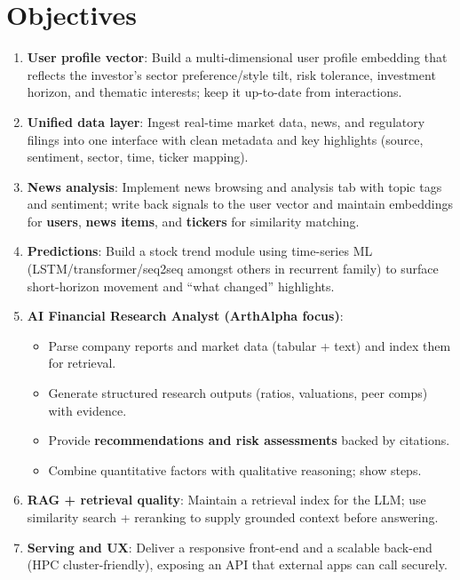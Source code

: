 \section{Objectives} 
\begin{enumerate}[label=(\alph*)]
  \item \textbf{User profile vector}: Build a multi-dimensional user profile embedding that reflects the investor's sector preference/style tilt, risk tolerance, investment horizon, and thematic interests; keep it up-to-date from interactions.
  \item \textbf{Unified data layer}: Ingest real-time market data, news, and regulatory filings into one interface with clean metadata and key highlights (source, sentiment, sector, time, ticker mapping).
  \item \textbf{News analysis}: Implement news browsing and analysis tab with topic tags and sentiment; write back signals to the user vector and maintain embeddings for \textbf{users}, \textbf{news items}, and \textbf{tickers} for similarity matching.
  \item \textbf{Predictions}: Build a stock trend module using time-series ML (\acs{LSTM}/transformer/seq2seq amongst others in recurrent family) to surface short-horizon movement and “what changed” highlights.
  \item \textbf{AI Financial Research Analyst (ArthAlpha focus)}:
  \begin{itemize}
    \item Parse company reports and market data (tabular + text) and index them for retrieval.
    \item Generate structured research outputs (ratios, valuations, peer comps) with evidence.
    \item Provide \textbf{recommendations and risk assessments} backed by citations.
    \item Combine quantitative factors with qualitative reasoning; show steps.
  \end{itemize}
  \item \textbf{RAG + retrieval quality}: Maintain a retrieval index for the \acf{LLM}; use similarity search + reranking to supply grounded context before answering.
  \item \textbf{Serving and UX}: Deliver a responsive front-end and a scalable back-end (\acf{HPC} cluster-friendly), exposing an API that external apps can call securely.

\end{enumerate}
